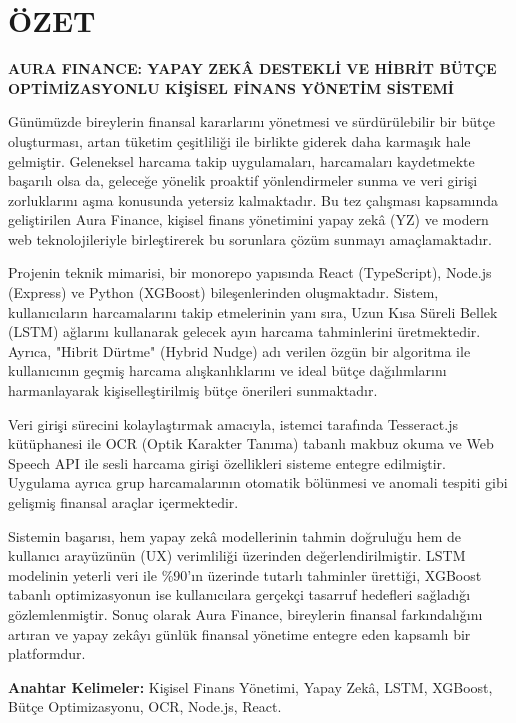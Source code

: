 \chapter*{ÖZET}

\begin{center}
{\large \textbf{AURA FINANCE: YAPAY ZEKÂ DESTEKLİ VE HİBRİT BÜTÇE OPTİMİZASYONLU KİŞİSEL FİNANS YÖNETİM SİSTEMİ}}
\end{center}
\vspace{1cm}

Günümüzde bireylerin finansal kararlarını yönetmesi ve sürdürülebilir bir bütçe oluşturması, artan tüketim çeşitliliği ile birlikte giderek daha karmaşık hale gelmiştir. Geleneksel harcama takip uygulamaları, harcamaları kaydetmekte başarılı olsa da, geleceğe yönelik proaktif yönlendirmeler sunma ve veri girişi zorluklarını aşma konusunda yetersiz kalmaktadır. Bu tez çalışması kapsamında geliştirilen Aura Finance, kişisel finans yönetimini yapay zekâ (YZ) ve modern web teknolojileriyle birleştirerek bu sorunlara çözüm sunmayı amaçlamaktadır.

Projenin teknik mimarisi, bir monorepo yapısında React (TypeScript), Node.js (Express) ve Python (XGBoost) bileşenlerinden oluşmaktadır. Sistem, kullanıcıların harcamalarını takip etmelerinin yanı sıra, Uzun Kısa Süreli Bellek (LSTM) ağlarını kullanarak gelecek ayın harcama tahminlerini üretmektedir. Ayrıca, "Hibrit Dürtme" (Hybrid Nudge) adı verilen özgün bir algoritma ile kullanıcının geçmiş harcama alışkanlıklarını ve ideal bütçe dağılımlarını harmanlayarak kişiselleştirilmiş bütçe önerileri sunmaktadır.

Veri girişi sürecini kolaylaştırmak amacıyla, istemci tarafında Tesseract.js kütüphanesi ile OCR (Optik Karakter Tanıma) tabanlı makbuz okuma ve Web Speech API ile sesli harcama girişi özellikleri sisteme entegre edilmiştir. Uygulama ayrıca grup harcamalarının otomatik bölünmesi ve anomali tespiti gibi gelişmiş finansal araçlar içermektedir.

Sistemin başarısı, hem yapay zekâ modellerinin tahmin doğruluğu hem de kullanıcı arayüzünün (UX) verimliliği üzerinden değerlendirilmiştir. LSTM modelinin yeterli veri ile \%90'ın üzerinde tutarlı tahminler ürettiği, XGBoost tabanlı optimizasyonun ise kullanıcılara gerçekçi tasarruf hedefleri sağladığı gözlemlenmiştir. Sonuç olarak Aura Finance, bireylerin finansal farkındalığını artıran ve yapay zekâyı günlük finansal yönetime entegre eden kapsamlı bir platformdur.

\textbf{Anahtar Kelimeler:} Kişisel Finans Yönetimi, Yapay Zekâ, LSTM, XGBoost, Bütçe Optimizasyonu, OCR, Node.js, React.
